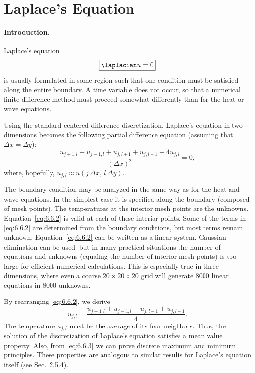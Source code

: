 \section{Laplace's Equation}
\label{sec:fd-laplace}

\paragraph{Introduction.}
Laplace's equation
\begin{equation}
\boxed{\laplacian u = 0}
\label{eq:6.6.1}
\end{equation}
is usually formulated in some region such that one condition must be satisfied along the entire boundary.  A time variable does not occur, so that a numerical finite difference method must proceed somewhat differently than for the heat or wave equations.

Using the standard centered difference discretization, Laplace's equation in two dimensions becomes the following partial difference equation (assuming that $\Delta x = \Delta y$):
\begin{equation}
\frac{u_{j+1,l} + u_{j-1,l} + u_{j,l+1} + u_{j,l-1} - 4u_{j,l}}{(\Delta x)^2} = 0,
\label{eq:6.6.2}
\end{equation}
where, hopefully, $u_{j,l} \approx u(j\,\Delta x,\ l\,\Delta y)$.

The boundary condition may be analyzed in the same way as for the heat and wave equations.  In the simplest case it is specified along the boundary (composed of mesh points).  The temperatures at the interior mesh points are the unknowns.  Equation~\eqref{eq:6.6.2} is valid at each of these interior points.  Some of the terms in \eqref{eq:6.6.2} are determined from the boundary conditions, but most terms remain unknown.  Equation~\eqref{eq:6.6.2} can be written as a linear system.  Gaussian elimination can be used, but in many practical situations the number of equations and unknowns (equaling the number of interior mesh points) is too large for efficient numerical calculations.  This is especially true in three dimensions, where even a coarse $20\times 20\times 20$ grid will generate 8000 linear equations in 8000 unknowns.

By rearranging \eqref{eq:6.6.2}, we derive
\begin{equation}
\boxed{u_{j,l} = \frac{u_{j+1,l} + u_{j-1,l} + u_{j,l+1} + u_{j,l-1}}{4}.}
\label{eq:6.6.3}
\end{equation}
The temperature $u_{j,l}$ must be the average of its four neighbors.  Thus, the solution of the discretization of Laplace's equation satisfies a mean value property.  Also, from \eqref{eq:6.6.3} we can prove discrete maximum and minimum principles.  These properties are analogous to similar results for Laplace's equation itself (see Sec.~2.5.4).

